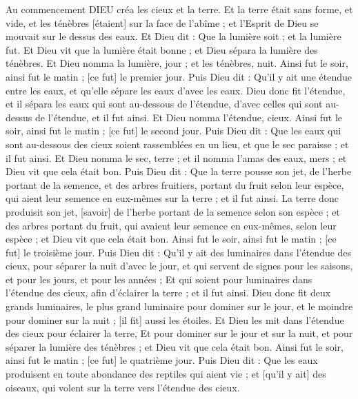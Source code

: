 \BFont
\begin{multicols}{2}
\VerseOne{}Au commencement DIEU créa les cieux et la terre.
Et la terre était sans forme, et vide, et les ténèbres [étaient] sur la face de l'abîme ; et l'Esprit de Dieu se mouvait sur le dessus des eaux.
Et Dieu dit : Que la lumière soit ; et la lumière fut.
Et Dieu vit que la lumière était bonne ; et Dieu sépara la lumière des ténèbres.
Et Dieu nomma la lumière, jour ; et les ténèbres, nuit. Ainsi fut le soir, ainsi fut le matin ; [ce fut] le premier jour.
Puis Dieu dit : Qu'il y ait une étendue entre les eaux, et qu'elle sépare les eaux d'avec les eaux.
Dieu donc fit l'étendue, et il sépara les eaux qui sont au-dessous de l'étendue, d'avec celles qui sont au-dessus de l'étendue, et il fut ainsi.
Et Dieu nomma l'étendue, cieux. Ainsi fut le soir, ainsi fut le matin ; [ce fut] le second jour.
Puis Dieu dit : Que les eaux qui sont au-dessous des cieux soient rassemblées en un lieu, et que le sec paraisse ; et il fut ainsi.
Et Dieu nomma le sec, terre ; et il nomma l'amas des eaux, mers ; et Dieu vit que cela était bon.
Puis Dieu dit : Que la terre pousse son jet, de l'herbe portant de la semence, et des arbres fruitiers, portant du fruit selon leur espèce, qui aient leur semence en eux-mêmes sur la terre ; et il fut ainsi.
La terre donc produisit son jet, [savoir] de l'herbe portant de la semence selon son espèce ; et des arbres portant du fruit, qui avaient leur semence en eux-mêmes, selon leur espèce ; et Dieu vit que cela était bon.
Ainsi fut le soir, ainsi fut le matin ; [ce fut] le troisième jour.
Puis Dieu dit : Qu'il y ait des luminaires dans l'étendue des cieux, pour séparer la nuit d'avec le jour, et qui servent de signes pour les saisons, et pour les jours, et pour les années ;
Et qui soient pour luminaires dans l'étendue des cieux, afin d'éclairer la terre ; et il fut ainsi.
Dieu donc fit deux grands luminaires, le plus grand luminaire pour dominer sur le jour, et le moindre pour dominer sur la nuit ; [il fit] aussi les étoiles.
Et Dieu les mit dans l'étendue des cieux pour éclairer la terre,
Et pour dominer sur le jour et sur la nuit, et pour séparer la lumière des ténèbres ; et Dieu vit que cela était bon.
Ainsi fut le soir, ainsi fut le matin ; [ce fut] le quatrième jour.
Puis Dieu dit : Que les eaux produisent en toute abondance des reptiles qui aient vie ; et [qu'il y ait] des oiseaux, qui volent sur la terre vers l'étendue des cieux.

\end{multicols}
